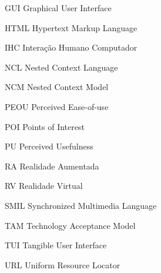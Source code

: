 \documentclass[
	12pt,				%
	openright,			%
	oneside,			%
	a4paper,			%
	ho do papel. 
	english,			%
	french,				%
	spanish,			%
	brazil,				%
	]{abntex2}
\begin{document}
\listoftables*
\cleardoublepage

\begin{siglas}

  \item[GUI] Graphical User Interface
  \item[HTML] Hypertext Markup Language
  \item[IHC] Interação Humano Computador
  \item[NCL] Nested Context Language  
  \item[NCM] Nested Context Model  
  \item[PEOU] Perceived Ease-of-use
  \item[POI] Points of Interest    
  \item[PU] Perceived Usefulness
  \item[RA] Realidade Aumentada
  \item[RV] Realidade Virtual  
  \item[SMIL] Synchronized Multimedia Language  
  \item[TAM] Technology Acceptance Model
  \item[TUI] Tangible User Interface
  \item[URL] Uniform Resource Locator
  
  
  
\end{siglas}


\tableofcontents*
\cleardoublepage


\textual

 

 

 

 

 

\postextual


\end{document}
